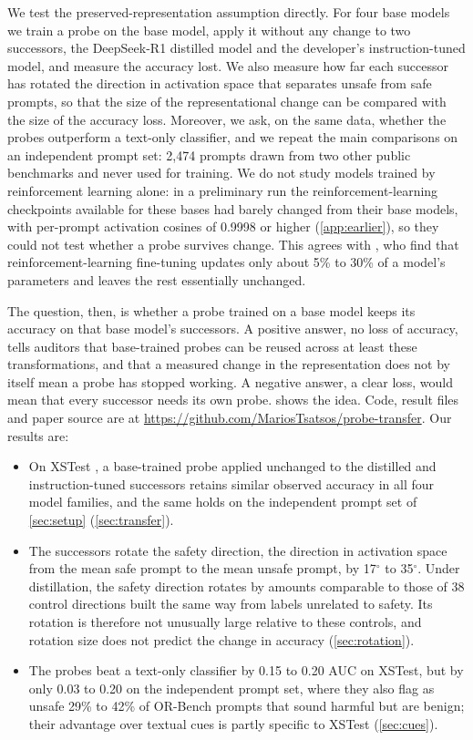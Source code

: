 \documentclass[10pt]{article}
\begin{document}
We test the preserved-representation assumption directly. For four base models we train a probe on the base model, apply it without any change to two successors, the DeepSeek-R1 distilled model and the developer's instruction-tuned model, and measure the accuracy lost. We also measure how far each successor has rotated the direction in activation space that separates unsafe from safe prompts, so that the size of the representational change can be compared with the size of the accuracy loss. Moreover, we ask, on the same data, whether the probes outperform a text-only classifier, and we repeat the main comparisons on an independent prompt set: 2,474 prompts drawn from two other public benchmarks and never used for training. We do not study models trained by reinforcement learning alone: in a preliminary run the reinforcement-learning checkpoints available for these bases had barely changed from their base models, with per-prompt activation cosines of 0.9998 or higher (\cref{app:earlier}), so they could not test whether a probe survives change. This agrees with \citet{mukherjee2025}, who find that reinforcement-learning fine-tuning updates only about 5\% to 30\% of a model's parameters and leaves the rest essentially unchanged.

The question, then, is whether a probe trained on a base model keeps its accuracy on that base model's successors. A positive answer, no loss of accuracy, tells auditors that base-trained probes can be reused across at least these transformations, and that a measured change in the representation does not by itself mean a probe has stopped working. A negative answer, a clear loss, would mean that every successor needs its own probe.  shows the idea. Code, result files and paper source are at \url{https://github.com/MariosTsatsos/probe-transfer}. Our results are:
\begin{itemize}
\item On XSTest \citep{rottger2024}, a base-trained probe applied unchanged to the distilled and instruction-tuned successors retains similar observed accuracy in all four model families, and the same holds on the independent prompt set of \cref{sec:setup} (\cref{sec:transfer}).
\item The successors rotate the safety direction, the direction in activation space from the mean safe prompt to the mean unsafe prompt, by 17$^\circ$ to 35$^\circ$. Under distillation, the safety direction rotates by amounts comparable to those of 38 control directions built the same way from labels unrelated to safety. Its rotation is therefore not unusually large relative to these controls, and rotation size does not predict the change in accuracy (\cref{sec:rotation}).
\item The probes beat a text-only classifier by 0.15 to 0.20 AUC on XSTest, but by only 0.03 to 0.20 on the independent prompt set, where they also flag as unsafe 29\% to 42\% of OR-Bench prompts that sound harmful but are benign; their advantage over textual cues is partly specific to XSTest (\cref{sec:cues}).
\end{itemize}
\end{document}
